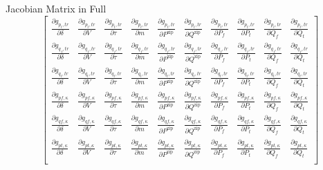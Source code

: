 \begin{frame}{Jacobian Matrix in Full}
\[\begin{bmatrix}
        \frac{\partial g_{p_t,tr}}{\partial \delta} & \frac{\partial g_{p_t,tr}}{\partial V} & \frac{\partial g_{p_t,tr}}{\partial \tau} & \frac{\partial g_{p_t,tr}}{\partial m} & \frac{\partial g_{p_t,tr}}{\partial P^\text{zip}} & \frac{\partial g_{p_t,tr}}{\partial Q^\text{zip}} & \frac{\partial g_{p_t,tr}}{\partial P_f} & \frac{\partial g_{p_t,tr}}{\partial P_t} & \frac{\partial g_{p_t,tr}}{\partial Q_f} & \frac{\partial g_{p_t,tr}}{\partial Q_t} \\
        \frac{\partial g_{q_f,tr}}{\partial \delta} & \frac{\partial g_{q_f,tr}}{\partial V} & \frac{\partial g_{q_f,tr}}{\partial \tau} & \frac{\partial g_{q_f,tr}}{\partial m} & \frac{\partial g_{q_f,tr}}{\partial P^\text{zip}} & \frac{\partial g_{q_f,tr}}{\partial Q^\text{zip}} & \frac{\partial g_{q_f,tr}}{\partial P_f} & \frac{\partial g_{q_f,tr}}{\partial P_t} & \frac{\partial g_{q_f,tr}}{\partial Q_f} & \frac{\partial g_{q_f,tr}}{\partial Q_t} \\
        \frac{\partial g_{q_t,tr}}{\partial \delta} & \frac{\partial g_{q_t,tr}}{\partial V} & \frac{\partial g_{q_t,tr}}{\partial \tau} & \frac{\partial g_{q_t,tr}}{\partial m} & \frac{\partial g_{q_t,tr}}{\partial P^\text{zip}} & \frac{\partial g_{q_t,tr}}{\partial Q^\text{zip}} & \frac{\partial g_{q_t,tr}}{\partial P_f} & \frac{\partial g_{q_t,tr}}{\partial P_t} & \frac{\partial g_{q_t,tr}}{\partial Q_f} & \frac{\partial g_{q_t,tr}}{\partial Q_t} \\
        \frac{\partial g_{pf, \kappa }}{\partial \delta} & \frac{\partial g_{pf, \kappa }}{\partial V} & \frac{\partial g_{pf, \kappa }}{\partial \tau} & \frac{\partial g_{pf, \kappa }}{\partial m} & \frac{\partial g_{pf, \kappa }}{\partial P^\text{zip}} & \frac{\partial g_{pf, \kappa }}{\partial Q^\text{zip}} & \frac{\partial g_{pf, \kappa }}{\partial P_f} & \frac{\partial g_{pf, \kappa }}{\partial P_t} & \frac{\partial g_{pf, \kappa }}{\partial Q_f} & \frac{\partial g_{pf, \kappa }}{\partial Q_t} \\
        \frac{\partial g_{qf, \kappa }}{\partial \delta} & \frac{\partial g_{qf, \kappa }}{\partial V} & \frac{\partial g_{qf, \kappa }}{\partial \tau} & \frac{\partial g_{qf, \kappa }}{\partial m} & \frac{\partial g_{qf, \kappa }}{\partial P^\text{zip}} & \frac{\partial g_{qf, \kappa }}{\partial Q^\text{zip}} & \frac{\partial g_{qf, \kappa }}{\partial P_f} & \frac{\partial g_{qf, \kappa }}{\partial P_t} & \frac{\partial g_{qf, \kappa }}{\partial Q_f} & \frac{\partial g_{qf, \kappa }}{\partial Q_t} \\
        \frac{\partial g_{pt, \kappa }}{\partial \delta} & \frac{\partial g_{pt, \kappa }}{\partial V} & \frac{\partial g_{pt, \kappa }}{\partial \tau} & \frac{\partial g_{pt, \kappa }}{\partial m} & \frac{\partial g_{pt, \kappa }}{\partial P^\text{zip}} & \frac{\partial g_{pt, \kappa }}{\partial Q^\text{zip}} & \frac{\partial g_{pt, \kappa }}{\partial P_f} & \frac{\partial g_{pt, \kappa }}{\partial P_t} & \frac{\partial g_{pt, \kappa }}{\partial Q_f} & \frac{\partial g_{pt, \kappa }}{\partial Q_t} \\

\end{bmatrix}\]
\end{frame}

